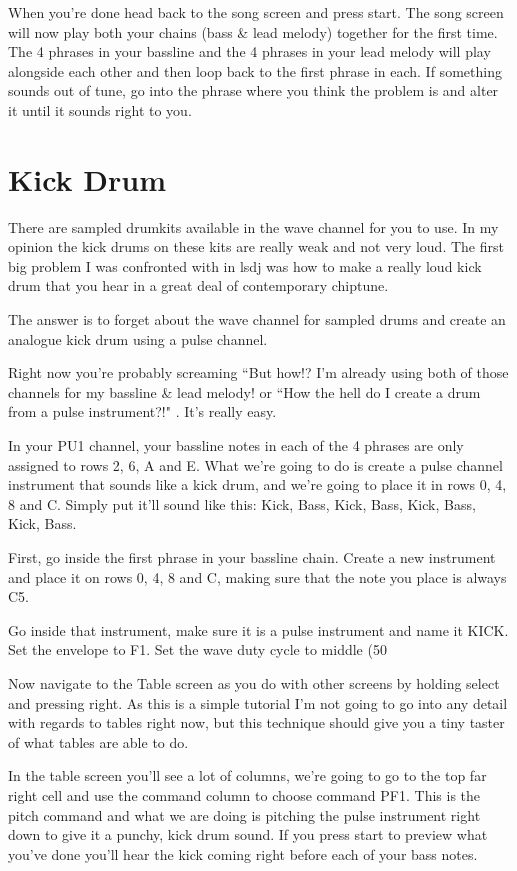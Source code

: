 \documentclass[]{article}
\begin{document}
When you’re done head back to the song screen and press start. The song screen will now play both your chains (bass \& lead melody) together for the first time. The 4 phrases in your bassline and the 4 phrases in your lead melody will play alongside each other and then loop back to the first phrase in each. If something sounds out of tune, go into the phrase where you think the problem is and alter it until it sounds right to you.

\section{Kick Drum}
There are sampled drumkits available in the wave channel for you to use. In my opinion the kick drums on these kits are really weak and not very loud. The first big problem I was confronted with in lsdj was how to make a really loud kick drum that you hear in a great deal of contemporary chiptune.

The answer is to forget about the wave channel for sampled drums and create an analogue kick drum using a pulse channel.

Right now you’re probably screaming “But how!? I’m already using both of those channels for my bassline \& lead melody! or “How the hell do I create a drum from a pulse instrument?!" . It’s really easy.

In your PU1 channel, your bassline notes in each of the 4 phrases are only assigned to rows 2, 6, A and E. What we’re going to do is create a pulse channel instrument that sounds like a kick drum, and we’re going to place it in rows 0, 4, 8 and C. Simply put it’ll sound like this: Kick, Bass, Kick, Bass, Kick, Bass, Kick, Bass.

First, go inside the first phrase in your bassline chain. Create a new instrument and place it on rows 0, 4, 8 and C, making sure that the note you place is always C5.

Go inside that instrument, make sure it is a pulse instrument and name it KICK. Set the envelope to F1. Set the wave duty cycle to middle (50%

Now navigate to the Table screen as you do with other screens by holding select and pressing right. As this is a simple tutorial I’m not going to go into any detail with regards to tables right now, but this technique should give you a tiny taster of what tables are able to do.

In the table screen you’ll see a lot of columns, we’re going to go to the top far right cell and use the command column to choose command PF1. This is the pitch command and what we are doing is pitching the pulse instrument right down to give it a punchy, kick drum sound. If you press start to preview what you’ve done you’ll hear the kick coming right before each of your bass notes.
\end{document}
